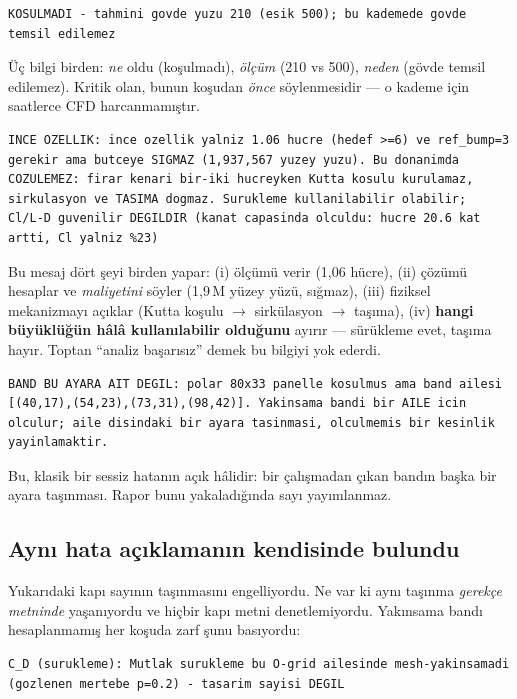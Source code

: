 \documentclass[11pt,a4paper]{article}
\begin{document}
\begin{lstlisting}
KOSULMADI - tahmini govde yuzu 210 (esik 500); bu kademede govde
temsil edilemez
\end{lstlisting}

\noindent Üç bilgi birden: \emph{ne} oldu (koşulmadı), \emph{ölçüm} (210 vs
500), \emph{neden} (gövde temsil edilemez). Kritik olan, bunun koşudan
\emph{önce} söylenmesidir --- o kademe için saatlerce CFD harcanmamıştır.

\begin{lstlisting}
INCE OZELLIK: ince ozellik yalniz 1.06 hucre (hedef >=6) ve ref_bump=3
gerekir ama butceye SIGMAZ (1,937,567 yuzey yuzu). Bu donanimda
COZULEMEZ: firar kenari bir-iki hucreyken Kutta kosulu kurulamaz,
sirkulasyon ve TASIMA dogmaz. Surukleme kullanilabilir olabilir;
Cl/L-D guvenilir DEGILDIR (kanat capasinda olculdu: hucre 20.6 kat
artti, Cl yalniz %23)
\end{lstlisting}

\noindent Bu mesaj dört şeyi birden yapar: (i) ölçümü verir (1{,}06 hücre),
(ii) çözümü hesaplar ve \emph{maliyetini} söyler (1{,}9\,M yüzey yüzü,
sığmaz), (iii) fiziksel mekanizmayı açıklar (Kutta koşulu $\rightarrow$
sirkülasyon $\rightarrow$ taşıma), (iv) \textbf{hangi büyüklüğün hâlâ
kullanılabilir olduğunu} ayırır --- sürükleme evet, taşıma hayır. Toptan
``analiz başarısız'' demek bu bilgiyi yok ederdi.

\begin{lstlisting}
BAND BU AYARA AIT DEGIL: polar 80x33 panelle kosulmus ama band ailesi
[(40,17),(54,23),(73,31),(98,42)]. Yakinsama bandi bir AILE icin
olculur; aile disindaki bir ayara tasinmasi, olculmemis bir kesinlik
yayinlamaktir.
\end{lstlisting}

\noindent Bu, klasik bir sessiz hatanın açık hâlidir: bir çalışmadan çıkan
bandın başka bir ayara taşınması. Rapor bunu yakaladığında sayı yayımlanmaz.

\subsection{Aynı hata açıklamanın kendisinde bulundu}

Yukarıdaki kapı sayının taşınmasını engelliyordu. Ne var ki aynı taşınma
\emph{gerekçe metninde} yaşanıyordu ve hiçbir kapı metni denetlemiyordu.
Yakınsama bandı hesaplanmamış her koşuda zarf şunu basıyordu:

\begin{lstlisting}
C_D (surukleme): Mutlak surukleme bu O-grid ailesinde mesh-yakinsamadi
(gozlenen mertebe p=0.2) - tasarim sayisi DEGIL
\end{lstlisting}
\end{document}
